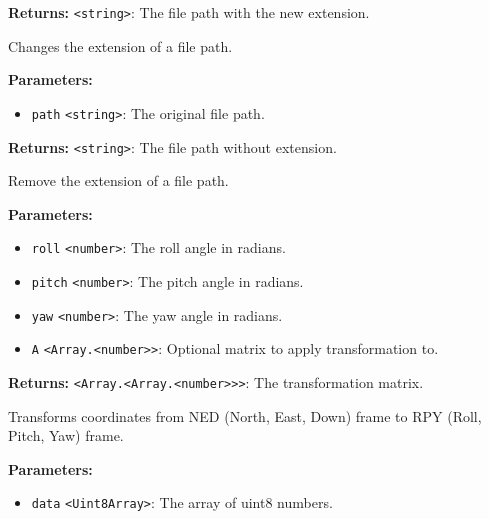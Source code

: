 \documentclass[12pt,a4paper]{article}
\begin{document}
\noindent \textbf{Returns:} \texttt{<string>}: The file path with the new extension.

\noindent Changes the extension of a file path.

\vspace{5mm}
\noindent {}


\noindent \textbf{Parameters:}
\begin{itemize}
  \item \texttt{path} \texttt{<string>}: The original file path.
\end{itemize}

\noindent \textbf{Returns:} \texttt{<string>}: The file path without extension.

\noindent Remove the extension of a file path.

\vspace{5mm}
\noindent {}


\noindent \textbf{Parameters:}
\begin{itemize}
  \item \texttt{roll} \texttt{<number>}: The roll angle in radians.
  \item \texttt{pitch} \texttt{<number>}: The pitch angle in radians.
  \item \texttt{yaw} \texttt{<number>}: The yaw angle in radians.
  \item \texttt{A} \texttt{<Array.<number>>}: Optional matrix to apply transformation to.
\end{itemize}

\noindent \textbf{Returns:} \texttt{<Array.<Array.<number>>>}: The transformation matrix.

\noindent Transforms coordinates from NED (North, East, Down) frame to RPY (Roll, Pitch, Yaw) frame.

\vspace{5mm}
\noindent {}


\noindent \textbf{Parameters:}
\begin{itemize}
  \item \texttt{data} \texttt{<Uint8Array>}: The array of uint8 numbers.
\end{itemize}
\end{document}

